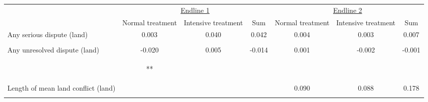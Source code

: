 \begin{tabular}{lcccccc}
\hline \noalign{\smallskip} & \multicolumn{3}{c}{\uline{\hfill Endline 1 \hfill}} & \multicolumn{3}{c}{\uline{\hfill Endline 2 \hfill}}\\
 & Normal treatment & Intensive treatment & Sum & Normal treatment & Intensive treatment & Sum\\
\noalign{\smallskip}\hline \noalign{\smallskip}Any serious dispute (land) & 0.003 & 0.040 & 0.042 & 0.004 & 0.003 & 0.007\\
 & \begin{footnotesize}[0.016]\end{footnotesize} & \begin{footnotesize}[0.029]\end{footnotesize} & \begin{footnotesize}[0.027]\end{footnotesize} & \begin{footnotesize}[0.011]\end{footnotesize} & \begin{footnotesize}[0.022]\end{footnotesize} & \begin{footnotesize}[0.022]\end{footnotesize}\\
\noalign{\smallskip}Any unresolved dispute (land) & -0.020 & 0.005 & -0.014 & 0.001 & -0.002 & -0.001\\
 & \begin{footnotesize}[0.008]**\end{footnotesize} & \begin{footnotesize}[0.012]\end{footnotesize} & \begin{footnotesize}[0.012]\end{footnotesize} & \begin{footnotesize}[0.005]\end{footnotesize} & \begin{footnotesize}[0.009]\end{footnotesize} & \begin{footnotesize}[0.009]\end{footnotesize}\\
\noalign{\smallskip}Length of mean land conflict (land) &  &  &  & 0.090 & 0.088 & 0.178\\
 & \begin{footnotesize}\end{footnotesize} & \begin{footnotesize}\end{footnotesize} & \begin{footnotesize}\end{footnotesize} & \begin{footnotesize}[0.097]\end{footnotesize} & \begin{footnotesize}[0.195]\end{footnotesize} & \begin{footnotesize}[0.193]\end{footnotesize}\\

\end{tabular}
